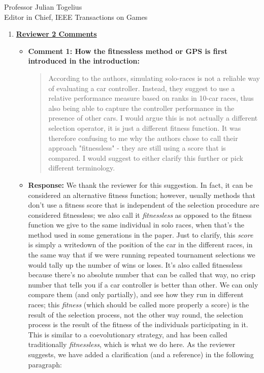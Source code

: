 \documentclass[10pt]{letter} %
\begin{document}
\begin{letter}{Professor Julian Togelius \\ Editor in Chief, IEEE Transactions on Games}
\begin{enumerate}
\item {\bf \underline{ Reviewer 2 Comments}}\\
	\begin{itemize}
		\item {\bf  Comment 1:  How the fitnessless method or GPS is first introduced in the introduction:\\
			                \begin{quote}
				According to the authors, simulating solo-races is
				not a reliable way of evaluating a car
				controller. Instead, they suggest to use a relative
				performance measure based on ranks in 10-car races,
				thus also being able to capture the controller
				performance in the presence of other cars. I would
				argue this is not actually a different selection
				operator, it is just a different fitness function. It
				was therefore confusing to me why the authors chose
				to call their approach "fitnessless" - they are still
				using a score that is compared. I would suggest to
				either clarify this further or pick different
				terminology.
			\end{quote}}
			\item {\bf Response:}
		We thank the reviewer for this suggestion. In fact, it can be
		considered an alternative fitness function; however, usually methods that don't use a fitness score that is independent of the selection procedure are considered fitnessless; we also call it {\em fitnessless} as opposed to the fitness function we give to the same individual in solo races, when that's the method used in some generations in the paper. Just to clarify, this {\em score} is simply a writedown of the position of the car in the different races, in the
		same way that if we were running repeated tournament selections we would tally up the number of wins or loses. It's also called fitnessless because there's no absolute number that can be called that way, no crisp number that tells you if a car controller is better than other. We can only compare them (and only partially), and see how they
		run in different races; this {\em fitness} (which should be called 	more properly a score) is the result of the selection process, not the other way round, the selection process is the result of the fitness of the individuals participating in it. This is similar to a coevolutionary strategy, and has been called traditionally {\em fitnessless}, which is what we do here.
		As the reviewer suggests, we have added a clarification (and a
		reference) in the following paragraph:\\

\end{itemize}
\end{enumerate}
\end{letter}
\end{document}

